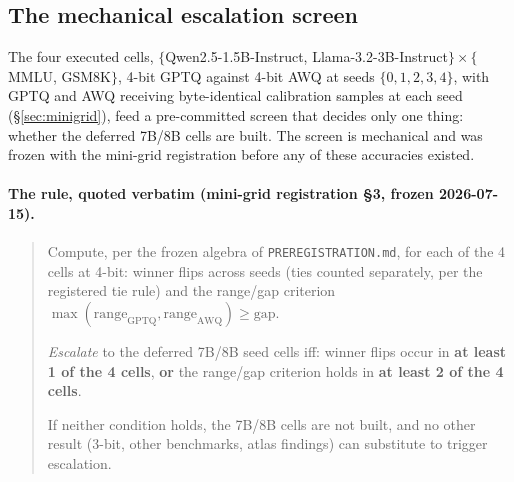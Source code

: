 %
%

\subsection{The mechanical escalation screen}
\label{sec:minigrid:escalation}

The four executed cells, $\{$Qwen2.5-1.5B-Instruct, Llama-3.2-3B-Instruct$\}
\times\{$MMLU, GSM8K$\}$, 4-bit GPTQ against 4-bit AWQ at seeds
$\{0,1,2,3,4\}$, with GPTQ and AWQ receiving byte-identical calibration samples
at each seed (\S\ref{sec:minigrid}), feed a pre-committed screen that decides
only one thing: whether the deferred 7B/8B cells are built. The screen is
mechanical and was frozen with the mini-grid registration before any of these
accuracies existed.

\paragraph{The rule, quoted verbatim (mini-grid registration \S3, frozen
2026-07-15).}
\begin{quote}
Compute, per the frozen algebra of \texttt{PREREGISTRATION.md}, for each of the
4 cells at 4-bit: winner flips across seeds (ties counted separately, per the
registered tie rule) and the range/gap criterion
$\max(\mathrm{range}_{\mathrm{GPTQ}}, \mathrm{range}_{\mathrm{AWQ}}) \geq
\mathrm{gap}$.

\emph{Escalate} to the deferred 7B/8B seed cells iff: winner flips occur in
\textbf{at least 1 of the 4 cells}, \textbf{or} the range/gap criterion holds in
\textbf{at least 2 of the 4 cells}.

If neither condition holds, the 7B/8B cells are not built, and no other result
(3-bit, other benchmarks, atlas findings) can substitute to trigger escalation.
\end{quote}

